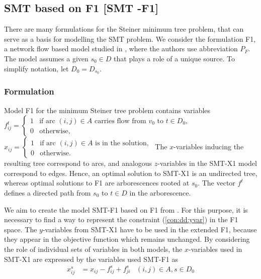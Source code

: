 \subsection{SMT based on F1 [SMT -F1]}

There are many formulations for the Steiner minimum tree problem, that can serve as a basis for modelling the SMT problem. We consider the formulation F1, a network flow based model studied in \cite{Polzin}, where the authors use abbreviation $P_{F}$. The model assumes a given $s_0\in D$ that plays a role of a unique source.  To simplify notation, let $D_0= D_{s_0}$.
\subsubsection{Formulation}
Model F1 for the minimum Steiner tree problem contains variables
\newline\newline  
  $f^{t}_{ij}=
	\begin{cases}
    1 & \text{if arc $(i,j) \in A$ carries flow from $v_0$ to $t\in D_0$},\\
    0 & \text{otherwise},
  \end{cases}$  
\newline\newline  
  $x_{ij}=
	\begin{cases}
    1 & \text{if arc $(i,j) \in A$ is in the solution},\\
    0 & \text{otherwise}.
  \end{cases}$  
\newline
\newline   
The $x$-variables inducing the resulting tree correspond to arcs, and analogous $z$-variables in the SMT-X1 model correspond to edges. Hence, an optimal solution to SMT-X1 is an undirected tree, whereas optimal solutions to F1 are arborescences rooted at $s_0$. The vector $f^t$ defines a directed path from $s_0$ to $t\in D$ in the arborescence.

We aim to create the model SMT-F1 based on F1 from \cite{Polzin}. For this purpose, it is necessary to find a way to represent the constraint (\ref{con:dd:yvar}) in the F1 space. The $y$-variables from SMT-X1 have to be used in the extended F1, because they appear in the objective function which remains unchanged. By considering the role of individual sets of variables in both models, the $x$-variables used in SMT-X1 are expressed by the variables used SMT-F1 as
\begin{align}
\label{eq:tr:xijsB}x^s_{ij}&= x_{ij}-f^s_{ij} + f^{s}_{ji} & (i,j)\in A, s\in D_0
\end{align}


